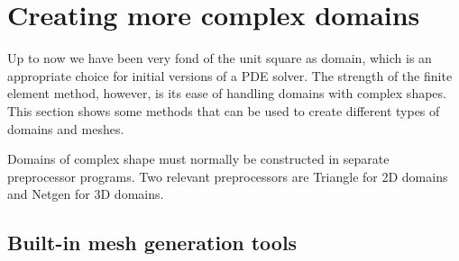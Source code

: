 \section{Creating more complex domains}
\label{langtangen:prepro}

Up to now we have been very fond of the unit square as domain,
which is an appropriate choice for initial versions of a 
PDE solver. The strength of the finite element method, however, is its
ease of handling domains with complex shapes. This section 
shows some methods that can be used to create different types of
domains and meshes.

Domains of complex shape must normally be constructed in separate
preprocessor programs. Two relevant preprocessors are Triangle for
2D domains and Netgen for 3D domains.

\subsection{Built-in mesh generation tools}
\label{langtangen:prepro:builtin}

